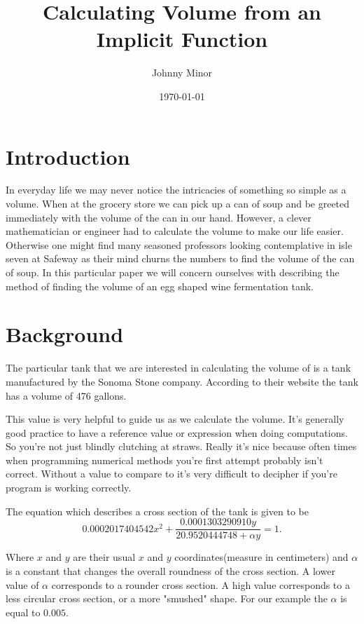 \documentclass[10pt, reqno]{article}
\title{Calculating Volume from an Implicit Function }
\author{Johnny Minor}
\date{\today}
\numberwithin{equation}{section}
\numberwithin{figure}{section}
\begin{document}
\maketitle

\section{Introduction}
In everyday life we may never notice the intricacies of something so simple as a volume. When at the grocery store we can pick up a can of soup and be greeted immediately with the volume of the can in our hand. However, a clever mathematician or engineer had to calculate the volume to make our life easier. Otherwise one might find many seasoned professors looking contemplative in isle seven at Safeway as their mind churns the numbers to find the volume of the can of soup. In this particular paper we will concern ourselves with describing the method of finding the volume of an egg shaped wine fermentation tank. 



\section{Background}
\label{sec:background}

The particular tank that we are interested in calculating the volume of is a tank manufactured by the Sonoma Stone company. 
According to their website the tank has a volume of 476 gallons. \cite{ref:sonoma}

This value is very helpful to guide us as we calculate the volume. It's generally good practice to have a reference value or expression when doing computations. So you're not just blindly clutching at straws. Really it's nice because often times when programming numerical methods you're first attempt probably isn't correct. Without a value to compare to it's very difficult to decipher if you're program is working correctly. 

The equation which describes a cross section of the tank is given to be 
\begin{equation}
0.0002017404542x^2 + \frac{0.0001303290910y}{20.9520444748+\alpha y} = 1.
\end{equation}

\noindent Where $x$ and $y$ are their usual $x$ and $y$ coordinates(measure in centimeters) and $\alpha$ is a constant that changes the overall roundness of the cross section. A lower value of $\alpha$ corresponds to a rounder cross section. A high value corresponds to a less circular cross section, or a more "smushed" shape. For our example the $\alpha$ is equal to $0.005$. 
\end{document}
